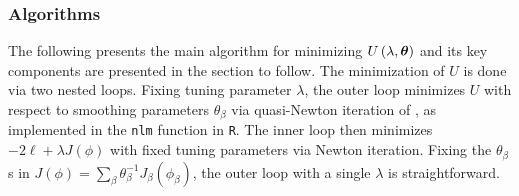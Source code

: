 \subsubsection{Algorithms}

The following presents the main algorithm for minimizing $U\left(\lambda, \mbox{\boldmath $\theta$} \right)$ and its key components are presented in the section to follow. The minimization of $U$ is done via two nested loops. Fixing tuning parameter $\lambda$, the outer loop minimizes $U$ with respect to smoothing parameters $\theta_\beta$ via quasi-Newton iteration of \cite{dennis1996numerical}, as implemented in the \texttt{nlm} function in \texttt{R}. The inner loop then minimizes $-2\ell + \lambda J\left(\phi\right)$ with fixed tuning parameters via Newton iteration. Fixing the $\theta_\beta$s in $J \left(\phi\right) = \sum_\beta \theta^{-1}_\beta J_\beta \left(\phi_\beta\right)$, the outer loop with a single $\lambda$ is straightforward. 
 

